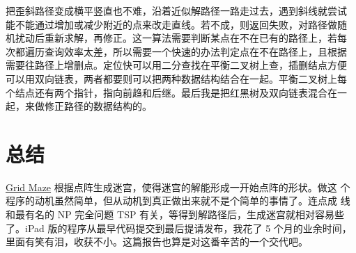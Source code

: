 \documentclass[cs4size,a4paper,adobefonts]{ctexart}
\newcommand{\GridMaze}{\href{http://itunes.apple.com/app/grid-maze/id553265800?mt=8}{Grid Maze}}
\begin{document}
把歪斜路径变成横平竖直也不难，沿着近似解路径一路走过去，遇到斜线就尝试
能不能通过增加或减少附近的点来改走直线。若不成，则返回失败，对路径做随
机扰动后重新求解，再修正。这一算法需要判断某点在不在已有的路径上，若每
次都遍历查询效率太差，所以需要一个快速的办法判定点在不在路径上，且根据
需要往路径上增删点。定位快可以用二分查找在平衡二叉树上查，插删结点方便
可以用双向链表，两者都要则可以把两种数据结构结合在一起。平衡二叉树上每
个结点还有两个指针，指向前趋和后继。最后我是把红黑树及双向链表混合在一
起，来做修正路径的数据结构的。

\section{总结}
\GridMaze{} 根据点阵生成迷宫，使得迷宫的解能形成一开始点阵的形状。做这
个程序的动机虽然简单，但从动机到真正做出来就不是个简单的事情了。连点成
线和最有名的 NP 完全问题 TSP 有关，等得到解路径后，生成迷宫就相对容易些
了。iPad 版的程序从最早代码提交到最后提请发布，我花了 5 个月的业余时间，
里面有笑有泪，收获不小。这篇报告也算是对这番辛苦的一个交代吧。



\end{document}
